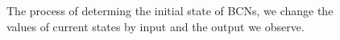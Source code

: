 \begin{figure}[thpb]
      \centering
      
      \caption{The process of determing the initial state of BCNs, we change the values of current states by input and the output we observe. }
      \label{fig:5}
   \end{figure}


